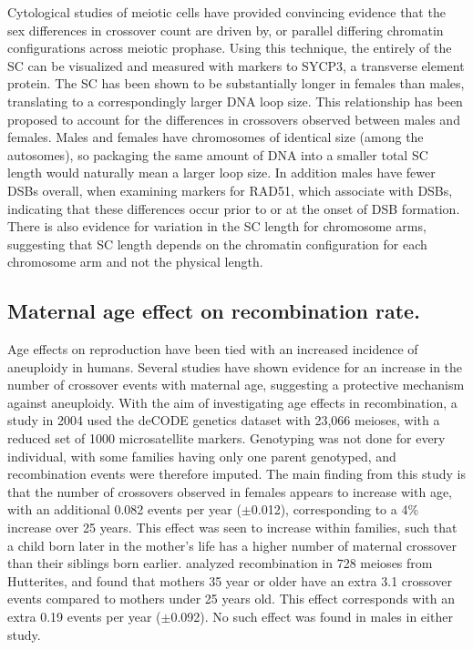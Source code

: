 Cytological studies of meiotic cells have provided convincing evidence that the sex differences in crossover count are driven by, or parallel differing chromatin configurations across meiotic prophase.
Using this technique, the entirely of the SC can be visualized and measured with markers to SYCP3, a transverse element protein.
The SC has been shown to be substantially longer in females than males, translating to a correspondingly larger DNA loop size\cite{Tease2004,Gruhn2013}.
This relationship has been proposed to account for the differences in crossovers observed between males and females.
Males and females have chromosomes of identical size (among the autosomes), so packaging the same amount of DNA into a smaller total SC length would naturally mean a larger loop size.
In addition males have fewer DSBs overall, when examining markers for RAD51, which associate with DSBs, indicating that these differences occur prior to or at the onset of DSB formation\cite{Gruhn2013}.
There is also evidence for variation in the SC length for chromosome arms, suggesting that SC length depends on the chromatin configuration for each chromosome arm and not the physical length\cite{Codina-Pascual2006a}.

\subsection{Maternal age effect on recombination rate.}

Age effects on reproduction have been tied with an increased incidence of aneuploidy in humans\cite{Hassold2001,Hassold2007}.
Several studies have shown evidence for an increase in the number of crossover events with maternal age, suggesting a protective mechanism against aneuploidy.
With the aim of investigating age effects in recombination, a study in 2004 used the deCODE genetics dataset with 23,066 meioses, with a reduced set of 1000 microsatellite markers\cite{Kong2004}.
Genotyping was not done for every individual, with some families having only one parent genotyped, and recombination events were therefore imputed.
The main finding from this study is that the number of crossovers observed in females appears to increase with age, with an additional 0.082 events per year ($\pm$0.012), corresponding to a 4\% increase over 25 years.
This effect was seen to increase within families, such that a child born later in the mother's life has a higher number of maternal crossover than their siblings born earlier.
\citet{Coop2008} analyzed recombination in 728 meioses from Hutterites, and found that mothers 35 year or older have an extra 3.1 crossover events compared to mothers under 25 years old.
This effect corresponds with an extra 0.19 events per year ($\pm$0.092).
No such effect was found in males in either study.

